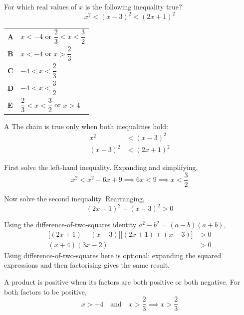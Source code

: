 \documentclass[11pt,a4paper]{article}
\begin{document}
\thispagestyle{djssolutions}
\djsFrontMatter
\clearpage
\thispagestyle{djssolutions}
\vspace*{8pt}
\begin{enumerate}[label=\textbf{\arabic*.},leftmargin=*,itemsep=0pt,start=1]
\questionitem[Inequalities]
For which real values of $x$ is the following inequality true?
\[
x^2<(x-3)^2<(2x+1)^2
\]

\par\vspace*{12pt}
\begin{tabularx}{\linewidth}{@{}>{\bfseries}l Y@{}}
A &
$x<-4$ or $\dfrac{2}{3}<x<\dfrac{3}{2}$
\\[0.8em]
B &
$x<-4$ or $x>\dfrac{2}{3}$
\\[0.8em]
C &
$-4<x<\dfrac{2}{3}$
\\[0.8em]
D &
$-4<x<\dfrac{3}{2}$
\\[0.8em]
E &
$\dfrac{2}{3}<x<\dfrac{3}{2}$ or $x>4$
\\
\end{tabularx}

\begin{djsSolution}{A}
The chain is true only when both inequalities hold:
\[
\begin{aligned}
x^2&<(x-3)^2\\[5pt]
(x-3)^2&<(2x+1)^2
\end{aligned}
\]

First solve the left-hand inequality. Expanding and simplifying,
\[
x^2<x^2-6x+9
\implies 6x<9
\implies x<\frac32
\]

Now solve the second inequality. Rearranging,
\[
(2x+1)^2-(x-3)^2>0
\]

Using the difference-of-two-squares identity $a^2-b^2=(a-b)(a+b)$,
\[
\begin{aligned}
\bigl[(2x+1)-(x-3)\bigr]\bigl[(2x+1)+(x-3)\bigr]&>0\\[5pt]
(x+4)(3x-2)&>0
\end{aligned}
\]
Using difference-of-two-squares here is optional: expanding the squared expressions and then factorising gives the same result.

A product is positive when its factors are both positive or both negative. For both factors to be positive,
\[
x>-4\quad\text{and}\quad x>\frac23
\implies x>\frac23
\]


\end{djsSolution}
\end{enumerate}
\end{document}
